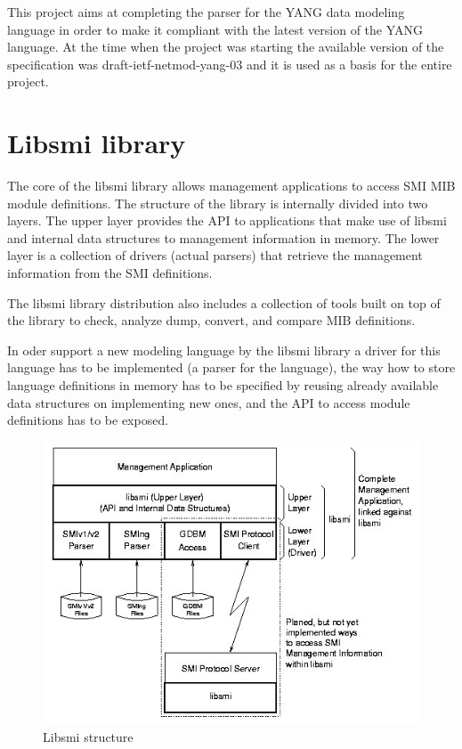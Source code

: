 \documentclass[conference]{IEEEtran}
\begin{document}
This project aims at completing the parser for the YANG data modeling language in order to make it compliant with the latest version of the YANG language. At the time when the project was starting the available version of the specification was draft-ietf-netmod-yang-03 \cite{bib3} and it is used as a basis for the entire project.

\section{Libsmi library}
The core of the libsmi library allows management applications to access SMI MIB module definitions. The structure of the library \cite{bib7} is internally divided into two layers. The upper layer provides the API to applications that make use of libsmi and internal data structures to management information in memory. The lower layer is a collection of drivers (actual parsers) that retrieve the management information from the SMI definitions. 

The libsmi library distribution also includes a collection of tools built on top of the library to check, analyze dump, convert, and compare MIB definitions.

In oder support a new modeling language by the libsmi library a driver for this language has to be implemented (a parser for the language), the way how to store language definitions in memory has to be specified by reusing already available data structures on implementing new ones, and the API to access module definitions has to be exposed.
\begin{figure}
\begin{center}
\includegraphics[scale=0.50]{libsmi.jpg}
\caption{ Libsmi structure}
\label{fig:libsmi}
\end{center}
\end{figure}
\end{document}
